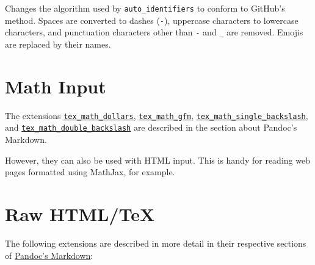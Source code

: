 \documentclass[
  b5paper
]{book}
\begin{document}
Changes the algorithm used by \texttt{auto\_identifiers} to conform to
GitHub's method. Spaces are converted to dashes (\texttt{-}), uppercase
characters to lowercase characters, and punctuation characters other
than \texttt{-} and \texttt{\_} are removed. Emojis are replaced by
their names.

\section{Math Input}\label{math-input}

The extensions
\hyperref[extension-tex_math_dollars]{\texttt{tex\_math\_dollars}},
\hyperref[extension-tex_math_gfm]{\texttt{tex\_math\_gfm}},
\hyperref[extension-tex_math_single_backslash]{\texttt{tex\_math\_single\_backslash}},
and
\hyperref[extension-tex_math_double_backslash]{\texttt{tex\_math\_double\_backslash}}
are described in the section about Pandoc's Markdown.

However, they can also be used with HTML input. This is handy for
reading web pages formatted using MathJax, for example.

\section{Raw HTML/TeX}\label{raw-htmltex}

The following extensions are described in more detail in their
respective sections of \hyperref[pandocs-markdown]{Pandoc's Markdown}:
\end{document}
